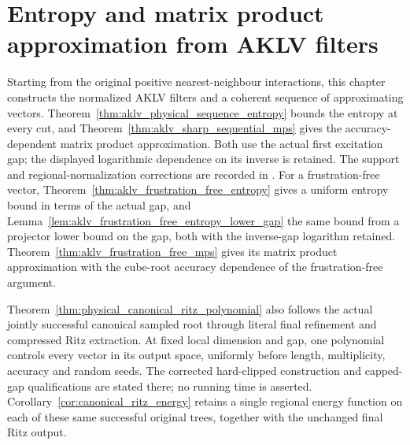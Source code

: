 \chapter{Entropy and matrix product approximation from AKLV filters}
\label{ch:aklv_entropy_approximation}

Starting from the original positive nearest-neighbour interactions, this
chapter constructs the normalized AKLV filters and a coherent sequence of
approximating vectors. Theorem~\ref{thm:aklv_physical_sequence_entropy}
bounds the entropy at every cut, and
Theorem~\ref{thm:aklv_sharp_sequential_mps} gives the accuracy-dependent
matrix product approximation. Both use the actual first excitation gap;
the displayed logarithmic dependence on its inverse is retained. The
support and regional-normalization corrections are recorded in
\cite{gap:aklv13_two_block_robustness}.
For a frustration-free vector, Theorem~\ref{thm:aklv_frustration_free_entropy}
gives a uniform entropy bound in terms of the actual gap, and
Lemma~\ref{lem:aklv_frustration_free_entropy_lower_gap} the same bound from
a projector lower bound on the gap, both with the inverse-gap logarithm
retained.
Theorem~\ref{thm:aklv_frustration_free_mps} gives its matrix product
approximation with the cube-root accuracy dependence of the frustration-free
argument.

Theorem~\ref{thm:physical_canonical_ritz_polynomial} also follows the
actual jointly successful canonical sampled root through literal final
refinement and compressed Ritz extraction. At fixed local dimension and
gap, one polynomial controls every vector in its output space, uniformly
before length, multiplicity, accuracy and random seeds. The corrected
hard-clipped construction and capped-gap qualifications are stated there;
no running time is asserted. Corollary~\ref{cor:canonical_ritz_energy}
retains a single regional energy function on each of these same successful
original trees, together with the unchanged final Ritz output.

